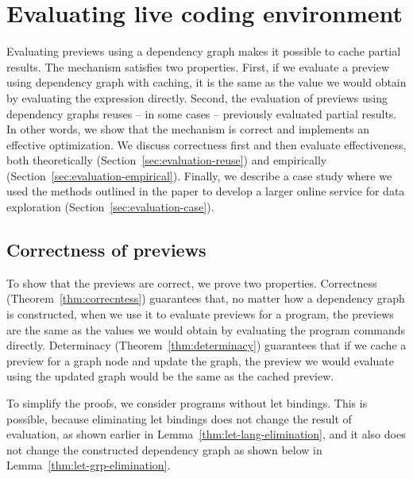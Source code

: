 \documentclass[acmsmall,anonymous,fleqn]{acmart}\settopmatter{printfolios=false,printccs=false,printacmref=false}
\theoremstyle{plain}
\theoremstyle{definition}
\begin{document}

\section{Evaluating live coding environment}
\label{sec:evaluation}

Evaluating previews using a dependency graph makes it possible to cache partial results.
The mechanism satisfies two properties. First, if we evaluate a preview using dependency
graph with caching, it is the same as the value we would obtain by evaluating the expression
directly. Second, the evaluation of previews using dependency graphs reuses -- in some cases --
previously evaluated partial results. In other words, we show that the mechanism is correct
and implements an effective optimization. We discuss correctness first and then evaluate
effectiveness, both theoretically (Section~\ref{sec:evaluation-reuse}) and empirically
(Section~\ref{sec:evaluation-empirical}). Finally, we describe a case study where we used the
methods outlined in the paper to develop a larger online service for data exploration
(Section~\ref{sec:evaluation-case}).


\subsection{Correctness of previews}
\label{sec:evaluation-correctness}

To show that the previews are correct, we prove two properties. Correctness
(Theorem~\ref{thm:correcntess}) guarantees that, no matter how a dependency graph is constructed,
when we use it to evaluate previews for a program, the previews are the same as the values we
would obtain by evaluating the program commands directly. Determinacy (Theorem~\ref{thm:determinacy})
guarantees that if we cache a preview for a graph node and update the graph, the preview we would
evaluate using the updated graph would be the same as the cached preview.

To simplify the proofs, we consider programs without let bindings. This is possible, because
eliminating let bindings does not change the result of evaluation, as shown earlier in
Lemma~\ref{thm:let-lang-elimination}, and it also does not change the constructed dependency graph
as shown below in Lemma~\ref{thm:let-grp-elimination}.
\end{document}
